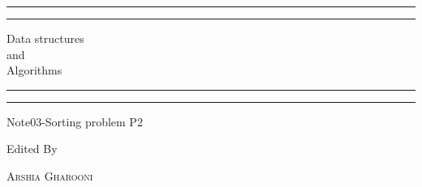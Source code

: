 \documentclass[a4paper, 11pt, oneside]{book} %
\begin{document}
 

\begin{titlepage} %

	\centering %
	
	\scshape %
	
	\vspace*{\baselineskip} %
	
	
	\rule{\textwidth}{1.6pt}\vspace*{-\baselineskip}\vspace*{2pt} %
	\rule{\textwidth}{0.4pt} %
	
	\vspace{0.75\baselineskip} %
	
	{\LARGE Data structures\\ and\\ Algorithms\\} %
	
	\vspace{0.75\baselineskip} %
	
	\rule{\textwidth}{0.4pt}\vspace*{-\baselineskip}\vspace{3.2pt} %
	\rule{\textwidth}{1.6pt} %
	
	\vspace{2\baselineskip} %
	
	
	Note03-Sorting problem P2%
	
	\vspace*{3\baselineskip} %
	
	
	Edited By
	
	\vspace{0.5\baselineskip} %
	
	{\scshape\Large Arshia Gharooni \\} %
	

\end{titlepage}
\end{document}
